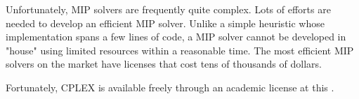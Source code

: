 Unfortunately, MIP solvers are frequently quite complex.
Lots of efforts are needed to develop an efficient MIP solver.
Unlike a simple heuristic whose implementation spans a few lines of code,
a MIP solver cannot be developed in "house" using limited resources within a reasonable time.
The most efficient MIP solvers on the market have licenses that cost tens of thousands of dollars.

Fortunately, CPLEX is available freely through an academic license at this
.
